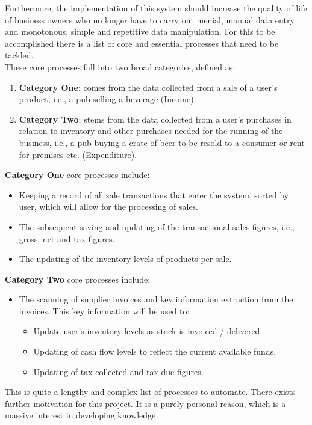 Furthermore, the implementation of this system should increase the quality of life of business owners who no longer have to carry out menial, manual data entry and monotonous, simple and
repetitive data manipulation.
\bigbreak
For this to be accomplished there is a list of
core and essential processes that need to be tackled. \\
These core processes fall into two broad categories, defined as:
\begin{enumerate}
	\item \textbf{Category One}: comes from the data collected from a sale of a user's product, i.e., a pub selling a beverage (Income).
	\item \textbf{Category Two}: stems from the data collected from a user's purchases in relation to inventory and other purchases needed for the running of the
	      business, i.e., a pub buying a crate of beer to be resold to a consumer or rent for premises etc. (Expenditure).
\end{enumerate}
\textbf{Category One} core processes include:
\begin{itemize}
	\item Keeping a record of all sale transactions that enter the system, sorted by user, which will allow for the processing of sales.
	\item The subsequent saving and updating of the transactional sales figures, i.e., gross, net and tax figures.
	\item The updating of the inventory levels of products per sale.
\end{itemize}
\textbf{Category Two} core processes include:
\begin{itemize}
	\item The scanning of supplier invoices and key information extraction from the invoices. This key information will be used to:
	      \begin{itemize}
		      \item Update user's inventory levels as stock is invoiced / delivered.
		      \item Updating of cash flow levels to reflect the current available funds.
		      \item Updating of tax collected and tax due figures.
	      \end{itemize}
\end{itemize}
This is quite a lengthy and complex list of processes to automate.
\bigbreak
There exists further motivation for this project. It is a purely personal reason, which is a massive interest in developing knowledge
